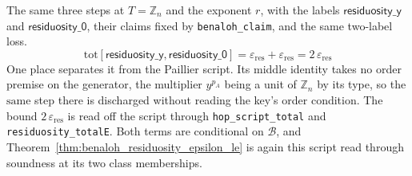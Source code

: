 \begin{definition}
  \label{def:benaloh_script}
  \rocqok
  The same three steps at $T = \mathbb{Z}_n$ and the exponent $r$, with the
  labels $\mathsf{residuosity\_y}$ and $\mathsf{residuosity\_0}$, their claims
  fixed by \texttt{benaloh\_claim}, and the same two-label loss.
  \[ \mathrm{tot}[\mathsf{residuosity\_y}, \mathsf{residuosity\_0}]
       = \varepsilon_{\mathrm{res}} + \varepsilon_{\mathrm{res}}
       = 2\,\varepsilon_{\mathrm{res}} \]
  One place separates it from the Paillier script. Its middle identity takes no
  order premise on the generator, the multiplier $y^{p_A}$ being a unit of
  $\mathbb{Z}_n$ by its type, so the $\mathrm{same}$ step there is discharged
  without reading the key's order condition. The bound
  $2\,\varepsilon_{\mathrm{res}}$ is read off the script through
  \texttt{hop\_script\_total} and \texttt{residuosity\_totalE}. Both terms are
  conditional on $\mathcal{B}$, and
  Theorem~\ref{thm:benaloh_residuosity_epsilon_le} is again this script read
  through soundness at its two class memberships.
\end{definition}

